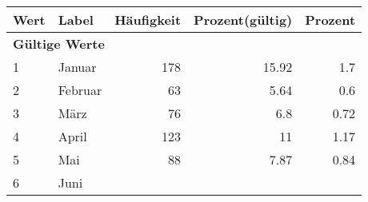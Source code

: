      \begin{longtable}{lXrrr}
     \toprule
     \textbf{Wert} & \textbf{Label} & \textbf{Häufigkeit} & \textbf{Prozent(gültig)} & \textbf{Prozent} \\
     \endhead
     \midrule
     \multicolumn{5}{l}{\textbf{Gültige Werte}}\\

     1 &
     \multicolumn{1}{X}{ Januar   } &


       \num{178} &
       \num[round-mode=places,round-precision=2]{15.92} &
         \num[round-mode=places,round-precision=2]{1.7} \\

     2 &
     \multicolumn{1}{X}{ Februar   } &


       \num{63} &
       \num[round-mode=places,round-precision=2]{5.64} &
         \num[round-mode=places,round-precision=2]{0.6} \\

     3 &
     \multicolumn{1}{X}{ März   } &


       \num{76} &
       \num[round-mode=places,round-precision=2]{6.8} &
         \num[round-mode=places,round-precision=2]{0.72} \\

     4 &
     \multicolumn{1}{X}{ April   } &


       \num{123} &
       \num[round-mode=places,round-precision=2]{11} &
         \num[round-mode=places,round-precision=2]{1.17} \\

     5 &
     \multicolumn{1}{X}{ Mai   } &


       \num{88} &
       \num[round-mode=places,round-precision=2]{7.87} &
         \num[round-mode=places,round-precision=2]{0.84} \\

     6 &
     \multicolumn{1}{X}{ Juni   } &



\end{longtable}
